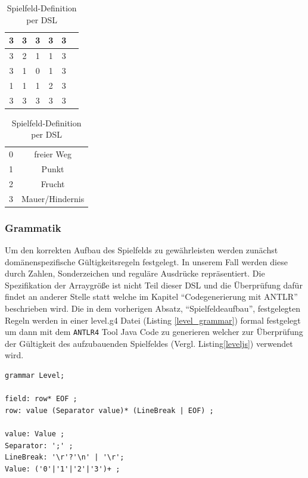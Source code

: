 \documentclass[conference]{IEEEtran}
\begin{document}
\begin{table}[!t]
\caption{Spielfeld-Definition per DSL}
\label{gameboard_dsl}
\centering
\begin{tabular}{|c|c|c|c|c|c|}
\hline
3 & 3 & 3 & 3 & 3\\
\hline
3 & 2 & 1 & 1 & 3\\
\hline
3 & 1 & 0 & 1 & 3\\
\hline
1 & 1 & 1 & 2 & 3\\
\hline
3 & 3 & 3 & 3 & 3\\
\hline
\end{tabular}
\begin{tabular}{|c|c|}
0 & freier Weg\\
1 & Punkt\\
2 & Frucht\\
3 & Mauer/Hindernis
\end{tabular}
\end{table}


\subsubsection{Grammatik}
Um den korrekten Aufbau des Spielfelds zu gewährleisten werden zunächst domänenspezifische Gültigkeitsregeln festgelegt. In unserem Fall werden diese durch Zahlen, Sonderzeichen und reguläre Ausdrücke repräsentiert. Die Spezifikation der Arraygröße ist nicht Teil dieser DSL und die Überprüfung dafür findet an anderer Stelle statt welche im Kapitel “Codegenerierung mit ANTLR” beschrieben wird. Die in dem vorherigen Absatz, “Spielfeldeaufbau”, festgelegten Regeln werden in einer level.g4 Datei (Listing \ref{level_grammar}) formal festgelegt um dann mit dem \texttt{ANTLR4} Tool Java Code zu generieren welcher zur Überprüfung der Gültigkeit des aufzubauenden Spielfeldes (Vergl. Listing\ref{leveljs}) verwendet wird.

\begin{lstlisting}[captionpos=b, caption={Auszug aus der DSL spezifizierenden Grammatik level.g4}, label=level_grammar]
grammar Level;

field: row* EOF ;
row: value (Separator value)* (LineBreak | EOF) ;

value: Value ;
Separator: ';' ;
LineBreak: '\r'?'\n' | '\r';
Value: ('0'|'1'|'2'|'3')+ ;
\end{lstlisting}
\end{document}
